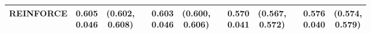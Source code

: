 \documentclass[12pt,oneside]{book}
\begin{document}
\begin{table}[htbp]
{\begin{tabular}{@{}l cc c cc c cc c cc@{}}
        \textbf{REINFORCE} & \makecell{\textcolor{dblue}{0.605} \\ 0.046} & \makecell{(0.602,\\0.608)} & & \makecell{\textcolor{dblue}{0.603} \\ 0.046} & \makecell{(0.600,\\0.606)} & & \makecell{\textcolor{dblue}{0.570} \\ 0.041} & \makecell{(0.567,\\0.572)} & & \makecell{\textcolor{dblue}{0.576} \\ 0.040} & \makecell{(0.574,\\0.579)} \\
        \bottomrule
    \end{tabular}}
\end{table}
\end{document}
